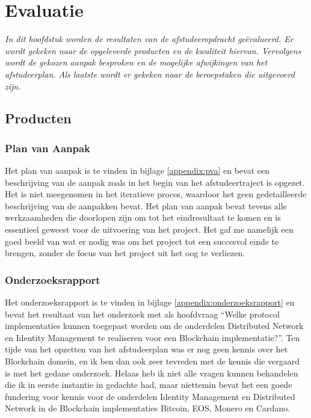 \chapter{Evaluatie}

\textit{In dit hoofdstuk worden de resultaten van de afstudeeropdracht geëvalueerd. Er wordt gekeken naar de opgeleverde producten en de kwaliteit hiervan. Vervolgens wordt de gekozen aanpak besproken en de mogelijke afwijkingen van het afstudeerplan. Als laatste wordt er gekeken naar de beroepstaken die uitgevoerd zijn.}

\section{Producten}

\subsection{Plan van Aanpak}

Het plan van aanpak is te vinden in bijlage \ref{appendix:pva} en bevat een beschrijving van de aanpak zoals in het begin van het afstudeertraject is opgezet. Het is niet meegenomen in het iteratieve proces, waardoor het geen gedetailleerde beschrijving van de aanpakken bevat. Het plan van aanpak bevat tevens alle werkzaamheden die doorlopen zijn om tot het eindresultaat te komen en is essentieel geweest voor de uitvoering van het project. Het gaf me namelijk een goed beeld van wat er nodig was om het project tot een succesvol einde te brengen, zonder de focus van het project uit het oog te verliezen.

\subsection{Onderzoeksrapport}

Het onderzoeksrapport is te vinden in bijlage \ref{appendix:onderzoeksrapport} en bevat het resultaat van het onderzoek met als hoofdvraag ``Welke protocol implementaties kunnen toegepast worden om de onderdelen Distributed Network en Identity Management te realiseren voor een Blockchain implementatie?''. Ten tijde van het opzetten van het afstudeerplan was er nog geen kennis over het Blockchain domein, en ik ben dan ook zeer tevreden met de kennis die vergaard is met het gedane onderzoek. Helaas heb ik niet alle vragen kunnen behandelen die ik in eerste instantie in gedachte had, maar niettemin bevat het een goede fundering voor kennis voor de onderdelen Identity Management en Distributed Network in de Blockchain implementaties Bitcoin, EOS, Monero en Cardano. 

